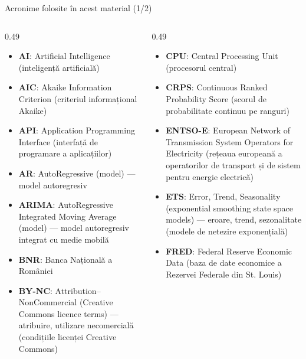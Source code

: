 {
\begin{frame}[noframenumbering]
    \titlepage
\end{frame}
}
\begin{frame}{Acronime folosite în acest material (1/2)}
\begin{columns}[T]
\begin{column}{0.49\textwidth}
\begin{itemize}\setlength{\itemsep}{0pt}
    \item \textbf{AI}: Artificial Intelligence (inteligență artificială)
    \item \textbf{AIC}: Akaike Information Criterion (criteriul informațional Akaike)
    \item \textbf{API}: Application Programming Interface (interfață de programare a aplicațiilor)
    \item \textbf{AR}: AutoRegressive (model) — model autoregresiv
    \item \textbf{ARIMA}: AutoRegressive Integrated Moving Average (model) — model autoregresiv integrat cu medie mobilă
    \item \textbf{BNR}: Banca Națională a României
    \item \textbf{BY-NC}: Attribution–NonCommercial (Creative Commons licence terms) — atribuire, utilizare necomercială (condițiile licenței Creative Commons)
\end{itemize}
\end{column}
\begin{column}{0.49\textwidth}
\begin{itemize}\setlength{\itemsep}{0pt}
    \item \textbf{CPU}: Central Processing Unit (procesorul central)
    \item \textbf{CRPS}: Continuous Ranked Probability Score (scorul de probabilitate continuu pe ranguri)
    \item \textbf{ENTSO-E}: European Network of Transmission System Operators for Electricity (rețeaua europeană a operatorilor de transport și de sistem pentru energie electrică)
    \item \textbf{ETS}: Error, Trend, Seasonality (exponential smoothing state space models) — eroare, trend, sezonalitate (modele de netezire exponențială)
    \item \textbf{FRED}: Federal Reserve Economic Data (baza de date economice a Rezervei Federale din St. Louis)
\end{itemize}
\end{column}
\end{columns}
\end{frame}
